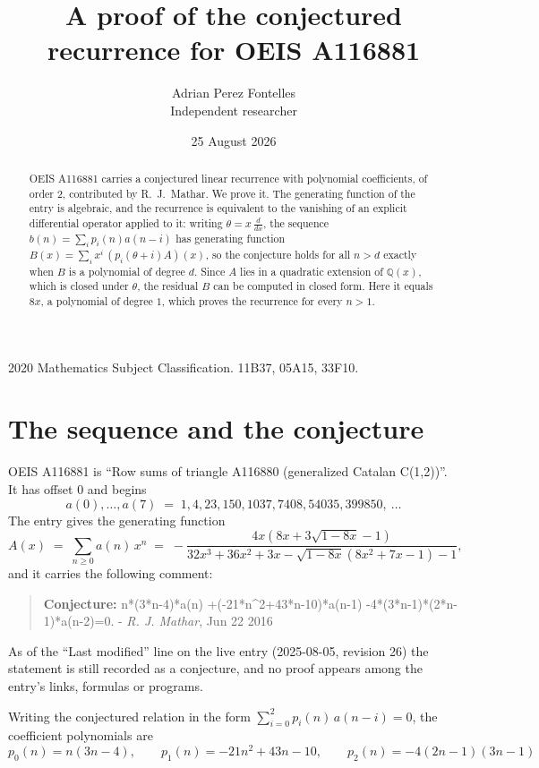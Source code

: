 \documentclass[11pt,a4paper]{article}
\title{A proof of the conjectured recurrence for OEIS A116881}
\author{Adrian Perez Fontelles\\ \small Independent researcher}
\date{25 August 2026}
\theoremstyle{plain}
\theoremstyle{definition}
\begin{document}
\maketitle

\begin{abstract}
OEIS A116881 carries a conjectured linear recurrence with polynomial coefficients, of
order 2, contributed by R.~J.~Mathar. We prove it. The generating function of the
entry is algebraic, and the recurrence is equivalent to the vanishing of an explicit
differential operator applied to it: writing $\theta=x\,\frac{d}{dx}$, the sequence
$b(n)=\sum_{i}p_{i}(n)a(n-i)$ has generating function
$B(x)=\sum_{i}x^{i}\,(p_{i}(\theta+i)A)(x)$, so the conjecture holds for all $n>d$ exactly
when $B$ is a polynomial of degree $d$. Since $A$ lies in a quadratic extension of
$\mathbb{Q}(x)$, which is closed under $\theta$, the residual $B$ can be computed in
closed form. Here it equals $8 x$, a polynomial of degree $1$, which proves
the recurrence for every $n>1$.
\end{abstract}

\noindent\small 2020 Mathematics Subject Classification. 11B37, 05A15, 33F10.\normalsize

\section{The sequence and the conjecture}

OEIS A116881 is ``Row sums of triangle A116880 (generalized Catalan C(1,2))''. It has offset $0$ and begins
\[
a(0),\dots,a(7)\;=\;1, 4, 23, 150, 1037, 7408, 54035, 399850,\ \dots
\]
The entry gives the generating function
\begin{equation}\label{eq:gf}
A(x)\;=\;\sum_{n\ge 0} a(n)\,x^{n}\;=\;- \frac{4 x \left(8 x + 3 \sqrt{1 - 8 x} - 1\right)}{32 x^{3} + 36 x^{2} + 3 x - \sqrt{1 - 8 x} \left(8 x^{2} + 7 x - 1\right) - 1} ,
\end{equation}
and it carries the following comment:
\begin{quote}\small
\textbf{Conjecture:} n*(3*n-4)*a(n) +(-21*n\^{}2+43*n-10)*a(n-1) -4*(3*n-1)*(2*n-1)*a(n-2)=0. - \emph{R. J. Mathar}, Jun 22 2016
\end{quote}
As of the ``Last modified'' line on the live entry (2025-08-05, revision 26) the
statement is still recorded as a conjecture, and no proof appears among the entry's links,
formulas or programs.

Writing the conjectured relation in the form $\sum_{i=0}^{2}p_{i}(n)\,a(n-i)=0$,
the coefficient polynomials are
\[
p_{0}(n)=n \left(3 n - 4\right),\qquad p_{1}(n)=- 21 n^{2} + 43 n - 10,\qquad p_{2}(n)=- 4 \left(2 n - 1\right) \left(3 n - 1\right)
\]
\end{document}
